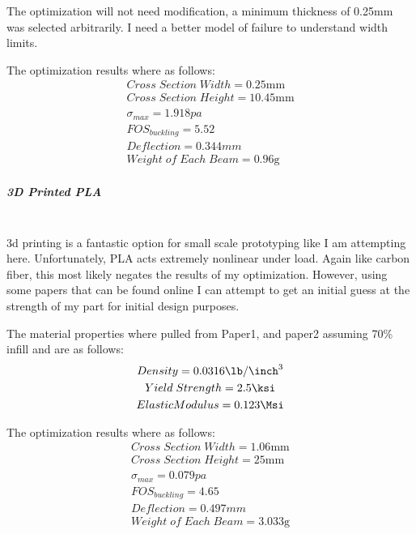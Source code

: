 \documentclass[12pt,letterpaper]{article}
\begin{document}
The optimization will not need modification, a minimum thickness of 0.25\unit{mm} was selected arbitrarily. I need a better model of failure to understand width limits. 

The optimization results where as follows:
\begin{gather*}
Cross\;Section\;Width = 0.25\unit{\mm}\\
Cross\;Section\;Height = 10.45\unit{\mm}\\
\sigma_{max} = 1.918\unit{pa}\\
FOS_{buckling} = 5.52\\
Deflection = 0.344\unit{mm}\\
Weight\;of\;Each\;Beam = 0.96\unit{\g}
\end{gather*}

\subparagraph{3D Printed PLA}
\mbox{}\\

3d printing is a fantastic option for small scale prototyping like I am attempting here. Unfortunately, PLA acts extremely nonlinear under load. Again like carbon fiber, this most likely negates the results of my optimization. However, using some papers that can be found online I can attempt to get an initial guess at the strength of my part for initial design purposes. 

The material properties where pulled from Paper1, and paper2 assuming 70\% infill and are as follows:
\begin{gather*}
Density = 0.0316\unit[per-mode = fraction]{\lb\per\inch\tothe{3}}\\
Yield\;Strength = 2.5\unit{\ksi}\\
Elastic Modulus = 0.123\unit{\Msi}
\end{gather*}

The optimization results where as follows:
\begin{gather*}
Cross\;Section\;Width = 1.06\unit{\mm}\\
Cross\;Section\;Height = 25\unit{\mm}\\
\sigma_{max} = 0.079\unit{pa}\\
FOS_{buckling} = 4.65\\
Deflection = 0.497\unit{mm}\\
Weight\;of\;Each\;Beam = 3.033\unit{\g}
\end{gather*}
\end{document}
